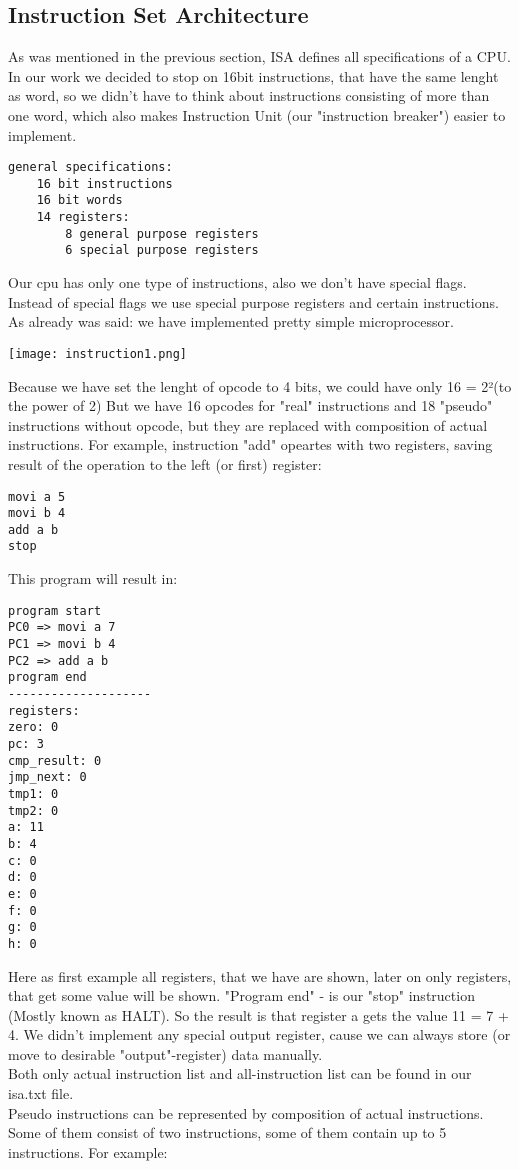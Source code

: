 \documentclass[11pt,a4paper]{article}
\begin{document}
\subsection{Instruction Set Architecture}
As was mentioned in the previous section, ISA defines all specifications of a CPU. In our work we decided to stop on 16bit instructions, that have the same lenght as word, so we didn't have to think about instructions consisting of more than one word, which also makes Instruction Unit (our "instruction breaker") easier to implement.
\begin{verbatim}
general specifications:
	16 bit instructions
	16 bit words
	14 registers:
		8 general purpose registers
		6 special purpose registers
\end{verbatim}
Our cpu has only one type of instructions, also we don't have special flags. Instead of special flags we use special purpose registers and certain instructions. As already was said: we have implemented pretty simple microprocessor.
\begin{center}
\texttt{[image: instruction1.png]}
\end{center}
Because we have set the lenght of opcode to 4 bits, we could have only 16 = 2²(to the power of 2) But we have 16 opcodes for "real" instructions and 18 "pseudo" instructions without opcode, but they are replaced with composition of actual instructions. For example, instruction "add" opeartes with two registers, saving result of the operation to the left (or first) register:
\begin{verbatim}
movi a 5
movi b 4
add a b
stop
\end{verbatim}
This program will result in:
\begin{verbatim}
program start
PC0 => movi a 7
PC1 => movi b 4
PC2 => add a b
program end
--------------------
registers:
zero: 0
pc: 3
cmp_result: 0
jmp_next: 0
tmp1: 0
tmp2: 0
a: 11
b: 4
c: 0
d: 0
e: 0
f: 0
g: 0
h: 0
\end{verbatim}
Here as first example all registers, that we have are shown, later on only registers, that get some value will be shown. "Program end" - is our "stop" instruction (Mostly known as HALT). So the result is that register a gets the value 11 = 7 + 4. We didn't implement any special output register, cause we can always store (or move to desirable "output"-register) data manually.\\
Both only actual instruction list and all-instruction list can be found in our isa.txt file.\\
Pseudo instructions can be represented by composition of actual instructions. Some of them consist of two instructions, some of them contain up to 5 instructions. For example:
\end{document}
